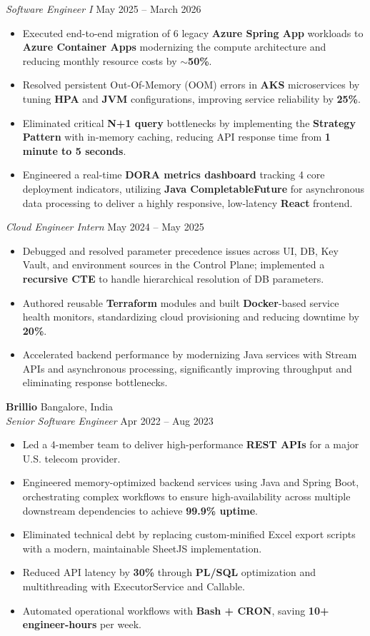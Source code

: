 \documentclass[10pt]{article}
\begin{document}
\textit{Software Engineer I} \hfill May 2025 -- March 2026
\begin{itemize}
    \item Executed end-to-end migration of 6 legacy \textbf{Azure Spring App} workloads to \textbf{Azure Container Apps} modernizing the compute architecture and reducing monthly resource costs by \textbf{$\sim$50\%}.
    \item Resolved persistent Out-Of-Memory (OOM) errors in \textbf{AKS} microservices by tuning \textbf{HPA} and \textbf{JVM} configurations, improving service reliability by \textbf{25\%}.
    \item Eliminated critical \textbf{N+1 query} bottlenecks by implementing the \textbf{Strategy Pattern} with in-memory caching, reducing API response time from \textbf{1 minute to 5 seconds}.
    \item Engineered a real-time \textbf{DORA metrics dashboard} tracking 4 core deployment indicators, utilizing \textbf{Java CompletableFuture} for asynchronous data processing to deliver a highly responsive, low-latency \textbf{React} frontend.
\end{itemize}

\textit{Cloud Engineer Intern} \hfill May 2024 -- May 2025
\begin{itemize}
    \item Debugged and resolved parameter precedence issues across UI, DB, Key Vault, and environment sources in the Control Plane; implemented a \textbf{recursive CTE} to handle hierarchical resolution of DB parameters.
    \item Authored reusable \textbf{Terraform} modules and built \textbf{Docker}-based service health monitors, standardizing cloud provisioning and reducing downtime by \textbf{20\%}.
    \item Accelerated backend performance by modernizing Java services with Stream APIs and asynchronous processing, significantly improving throughput and eliminating response bottlenecks.
\end{itemize}

\textbf{Brillio} \hfill Bangalore, India \\
\textit{Senior Software Engineer} \hfill Apr 2022 -- Aug 2023
\begin{itemize}
    \item Led a 4-member team to deliver high-performance \textbf{REST APIs} for a major U.S. telecom provider.
    \item Engineered memory-optimized backend services using Java and Spring Boot, orchestrating complex workflows to ensure high-availability across multiple downstream dependencies to achieve \textbf{99.9\% uptime}.
    \item Eliminated technical debt by replacing custom-minified Excel export scripts with a modern, maintainable SheetJS implementation.
    \item Reduced API latency by \textbf{30\%} through \textbf{PL/SQL} optimization and multithreading with ExecutorService and Callable.
    \item Automated operational workflows with \textbf{Bash + CRON}, saving \textbf{10+ engineer-hours} per week.
\end{itemize}
\end{document}
